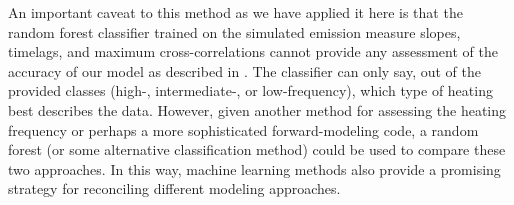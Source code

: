 An important caveat to this method as we have applied it here is that the random forest classifier trained on the simulated emission measure slopes, timelags, and maximum cross-correlations cannot provide any assessment of the accuracy of our model as described in . The classifier can only say, out of the provided classes (high-, intermediate-, or low-frequency), which type of heating best describes the data. However, given another method for assessing the heating frequency or perhaps a more sophisticated forward-modeling code, a random forest (or some alternative classification method) could be used to compare these two approaches. In this way, machine learning methods also provide a promising strategy for reconciling different modeling approaches.
